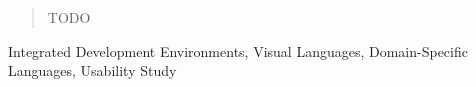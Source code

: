 \begin{abstract}
TODO
\end{abstract}



\keywords
Integrated Development Environments, Visual Languages, Domain-Specific
Languages, Usability Study

